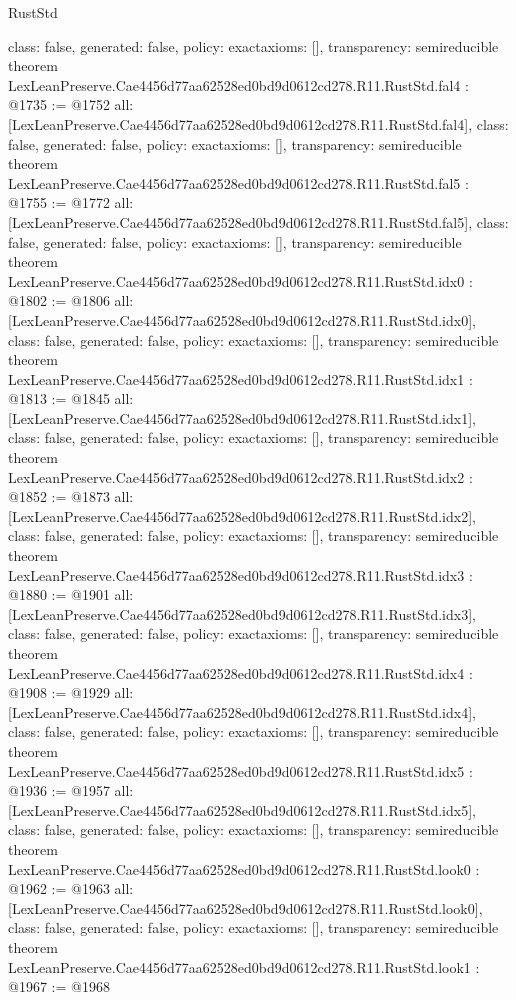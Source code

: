 \begin{lexlean}{RustStd}
\begin{coremodule}
{  class: false,
  generated: false,
  policy: exact{axioms: []},
  transparency: semireducible
}
theorem LexLeanPreserve.Cae4456d77aa62528ed0bd9d0612cd278.R11.RustStd.fal4 : @1735 := @1752 {
  all: [LexLeanPreserve.Cae4456d77aa62528ed0bd9d0612cd278.R11.RustStd.fal4],
  class: false,
  generated: false,
  policy: exact{axioms: []},
  transparency: semireducible
}
theorem LexLeanPreserve.Cae4456d77aa62528ed0bd9d0612cd278.R11.RustStd.fal5 : @1755 := @1772 {
  all: [LexLeanPreserve.Cae4456d77aa62528ed0bd9d0612cd278.R11.RustStd.fal5],
  class: false,
  generated: false,
  policy: exact{axioms: []},
  transparency: semireducible
}
theorem LexLeanPreserve.Cae4456d77aa62528ed0bd9d0612cd278.R11.RustStd.idx0 : @1802 := @1806 {
  all: [LexLeanPreserve.Cae4456d77aa62528ed0bd9d0612cd278.R11.RustStd.idx0],
  class: false,
  generated: false,
  policy: exact{axioms: []},
  transparency: semireducible
}
theorem LexLeanPreserve.Cae4456d77aa62528ed0bd9d0612cd278.R11.RustStd.idx1 : @1813 := @1845 {
  all: [LexLeanPreserve.Cae4456d77aa62528ed0bd9d0612cd278.R11.RustStd.idx1],
  class: false,
  generated: false,
  policy: exact{axioms: []},
  transparency: semireducible
}
theorem LexLeanPreserve.Cae4456d77aa62528ed0bd9d0612cd278.R11.RustStd.idx2 : @1852 := @1873 {
  all: [LexLeanPreserve.Cae4456d77aa62528ed0bd9d0612cd278.R11.RustStd.idx2],
  class: false,
  generated: false,
  policy: exact{axioms: []},
  transparency: semireducible
}
theorem LexLeanPreserve.Cae4456d77aa62528ed0bd9d0612cd278.R11.RustStd.idx3 : @1880 := @1901 {
  all: [LexLeanPreserve.Cae4456d77aa62528ed0bd9d0612cd278.R11.RustStd.idx3],
  class: false,
  generated: false,
  policy: exact{axioms: []},
  transparency: semireducible
}
theorem LexLeanPreserve.Cae4456d77aa62528ed0bd9d0612cd278.R11.RustStd.idx4 : @1908 := @1929 {
  all: [LexLeanPreserve.Cae4456d77aa62528ed0bd9d0612cd278.R11.RustStd.idx4],
  class: false,
  generated: false,
  policy: exact{axioms: []},
  transparency: semireducible
}
theorem LexLeanPreserve.Cae4456d77aa62528ed0bd9d0612cd278.R11.RustStd.idx5 : @1936 := @1957 {
  all: [LexLeanPreserve.Cae4456d77aa62528ed0bd9d0612cd278.R11.RustStd.idx5],
  class: false,
  generated: false,
  policy: exact{axioms: []},
  transparency: semireducible
}
theorem LexLeanPreserve.Cae4456d77aa62528ed0bd9d0612cd278.R11.RustStd.look0 : @1962 := @1963 {
  all: [LexLeanPreserve.Cae4456d77aa62528ed0bd9d0612cd278.R11.RustStd.look0],
  class: false,
  generated: false,
  policy: exact{axioms: []},
  transparency: semireducible
}
theorem LexLeanPreserve.Cae4456d77aa62528ed0bd9d0612cd278.R11.RustStd.look1 : @1967 := @1968 {
}
\end{coremodule}
\end{lexlean}
